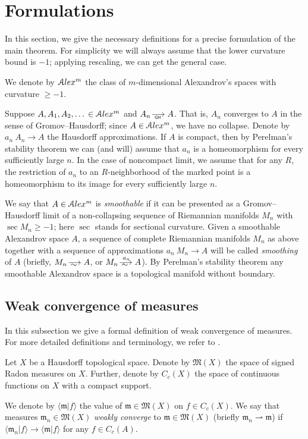 \section{Formulations}

In this section, we give the necessary definitions for a precise formulation of the main theorem.
For simplicity  we will always assume that the lower
curvature bound is  $-1$;
applying rescaling, we can get the general case.

We denote by
$\mathcal{A}lex^m$ the class of $m$-dimensional Alexandrov's spaces
with curvature $\ge -1$.

Suppose $A,A_1,A_2,\dots{} \in \mathcal{A}lex^m$ and $A_n\GHto A$.
That is, $A_n$ converges to 
$A$ in the sense of Gromov--Hausdorff;
since $A\in \mathcal{A}lex^m$, we have no collapse.
Denote by $a_n\:A_n\to A$ the Hausdorff approximations.
If $A$ is compact, then
by Perelman's stability theorem \cite{PerStab,KapStab} we can (and will) assume that $a_n$ is a homeomorphism for every sufficiently large $n$.
In the case of noncompact limit, we assume that for any $R$, the restriction of $a_n$ to an $R$-neighborhood of the marked point is a homeomorphism to its image for every sufficiently large $n$.

We say that $A\in \mathcal{A}lex^m$ is \emph{smoothable}
if it can be presented as a Gromov--Hausdorff limit of a non-collapsing sequence of Riemannian manifolds $M_n$ with $\sec M_n\ge-1$; here $\sec$ stands for sectional curvature.
Given a smoothable Alexandrov space $A$,
a sequence of complete Riemannian manifolds $M_n$ as above
together with a sequence of approximations $a_n\:M_n\to A$
will be called \emph{smoothing} of $A$
(briefly, $M_n\smooths{} A$, or $M_n\smooths{a_n} A$).
By Perelman's stability theorem any smoothable Alexandrov space is a topological manifold without boundary.

\subsection{Weak convergence of measures}

In this subsection we give a formal definition of weak convergence of measures.
For more detailed definitions and terminology, we refer to
\cite{GMS}.

Let $X$ be a Hausdorff topological space.
Denote by $\mathfrak M(X)$ the space of signed Radon measures on $X$.
Further, denote by $C_c(X)$  the space of continuous functions on $X$
with a compact support. 

We  denote by $\langle \mathfrak m|f\rangle $ the value of $\mathfrak m\in\mathfrak M(X)$ on $f\in C_c(X)$.
We say that measures $\mathfrak m_n\in \mathfrak M(X)$ \emph{weakly converge} to $\mathfrak m\in \mathfrak M(X)$ (briefly
$\mathfrak m_n\rightharpoonup \mathfrak m$) if $\langle \mathfrak m_n|f\rangle \to \langle \mathfrak m|f\rangle $ for any $f\in C_c(A)$.

